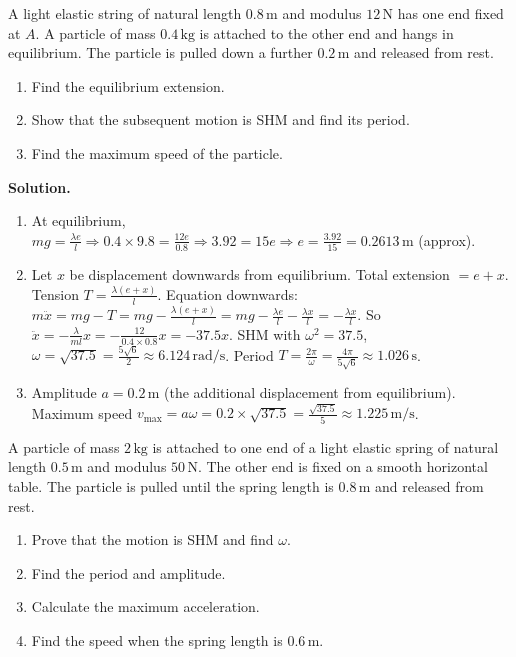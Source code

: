 \documentclass[11pt]{article}
\newcounter{popsec}
\newcounter{popsub}
\newcommand{\courssub}[1]{%
  \stepcounter{popsub}%
  \par\vspace{9pt}\noindent{\popxbold\fontsize{11.5}{13}\selectfont\color{popink}{\color{poporange}\thepopsec.\thepopsub}\hspace{6pt}#1}\par\nopagebreak\vspace{4pt}
}
\begin{document}
\begin{exoresolu}
A light elastic string of natural length $0.8\,\mathrm{m}$ and modulus $12\,\mathrm{N}$ has one end fixed at $A$. A particle of mass $0.4\,\mathrm{kg}$ is attached to the other end and hangs in equilibrium. The particle is pulled down a further $0.2\,\mathrm{m}$ and released from rest.
\begin{enumerate}
    \item Find the equilibrium extension.
    \item Show that the subsequent motion is SHM and find its period.
    \item Find the maximum speed of the particle.
\end{enumerate}

\tcblower
\textbf{Solution.}
\begin{enumerate}
    \item At equilibrium, $mg = \frac{\lambda e}{l} \Rightarrow 0.4 \times 9.8 = \frac{12e}{0.8} \Rightarrow 3.92 = 15e \Rightarrow e = \frac{3.92}{15} = 0.2613\,\mathrm{m}$ (approx).
    \item Let $x$ be displacement downwards from equilibrium. Total extension $= e+x$. Tension $T = \frac{\lambda(e+x)}{l}$.
    Equation downwards: $m\ddot{x} = mg - T = mg - \frac{\lambda(e+x)}{l} = mg - \frac{\lambda e}{l} - \frac{\lambda x}{l} = -\frac{\lambda x}{l}$.
    So $\ddot{x} = -\frac{\lambda}{ml}x = -\frac{12}{0.4 \times 0.8}x = -37.5x$.
    SHM with $\omega^2 = 37.5$, $\omega = \sqrt{37.5} = \frac{5\sqrt{6}}{2} \approx 6.124\,\mathrm{rad/s}$.
    Period $T = \frac{2\pi}{\omega} = \frac{4\pi}{5\sqrt{6}} \approx 1.026\,\mathrm{s}$.
    \item Amplitude $a = 0.2\,\mathrm{m}$ (the additional displacement from equilibrium).
    Maximum speed $v_{\max} = a\omega = 0.2 \times \sqrt{37.5} = \frac{\sqrt{37.5}}{5} \approx 1.225\,\mathrm{m/s}$.
\end{enumerate}
\end{exoresolu}

\courssub{Exercises}

\begin{exercice}[Exercise 1]
A particle of mass $2\,\mathrm{kg}$ is attached to one end of a light elastic spring of natural length $0.5\,\mathrm{m}$ and modulus $50\,\mathrm{N}$. The other end is fixed on a smooth horizontal table. The particle is pulled until the spring length is $0.8\,\mathrm{m}$ and released from rest.
\begin{enumerate}
    \item Prove that the motion is SHM and find $\omega$.
    \item Find the period and amplitude.
    \item Calculate the maximum acceleration.
    \item Find the speed when the spring length is $0.6\,\mathrm{m}$.
\end{enumerate}
\end{exercice}
\end{document}
